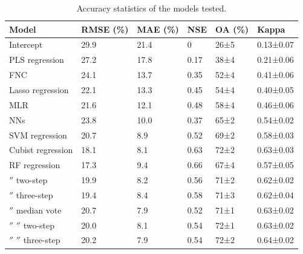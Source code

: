 \documentclass[a4paper,10pt]{article}
\begin{document}
\begin{table}
\centering
\begin{tabular}{llllll}
\toprule
\textbf{Model} & \textbf{\ac{RMSE} (\%)} & \textbf{\ac{MAE} (\%)} & \textbf{\acrshort{NSE}} & \textbf{\ac{OA} (\%)} & \textbf{Kappa} \\
\midrule
Intercept
& 29.9  & 21.4  & 0     & 26±5  & 0.13±0.07 \\
\Gls{PLS} regression
& 27.2  & 17.8  & 0.17  & 38±4  & 0.21±0.06 \\
\Gls{FNC}
& 24.1  & 13.7  & 0.35  & 52±4  & 0.41±0.06 \\
Lasso regression
& 22.1  & 13.3  & 0.45  & 54±4  & 0.40±0.05 \\
\Gls{MLR}
& 21.6  & 12.1  & 0.48  & 58±4  & 0.46±0.06 \\
\Glspl{NN}
& 23.8  & 10.0  & 0.37  & 65±2  & 0.54±0.02 \\
\Gls{SVM} regression
& 20.7  & 8.9   & 0.52  & 69±2  & 0.58±0.03 \\
Cubist regression
& 18.1  & 8.1   & 0.63  & 72±2  & 0.63±0.03 \\
\Gls{RF} regression
& 17.3  & 9.4   & 0.66  & 67±4  & 0.57±0.05 \\
\ensuremath{''} two-step
& 19.9  & 8.2   & 0.56  & 71±2  & 0.62±0.02 \\
\ensuremath{''} three-step
& 19.4  & 8.4   & 0.58  & 71±3  & 0.62±0.04 \\
\ensuremath{''} median vote
& 20.7  & 7.9   & 0.52  & 71±1  & 0.63±0.02 \\
\ensuremath{''} \ensuremath{''} two-step
& 20.0  & 8.1   & 0.54  & 72±1  & 0.63±0.02 \\
\ensuremath{''} \ensuremath{''} three-step
& 20.2  & 7.9   & 0.54  & 72±2  & 0.64±0.02 \\
\bottomrule
\end{tabular}
\caption{Accuracy statistics of the models tested.}
\label{tab-accuracy}
\end{table}
\end{document}
